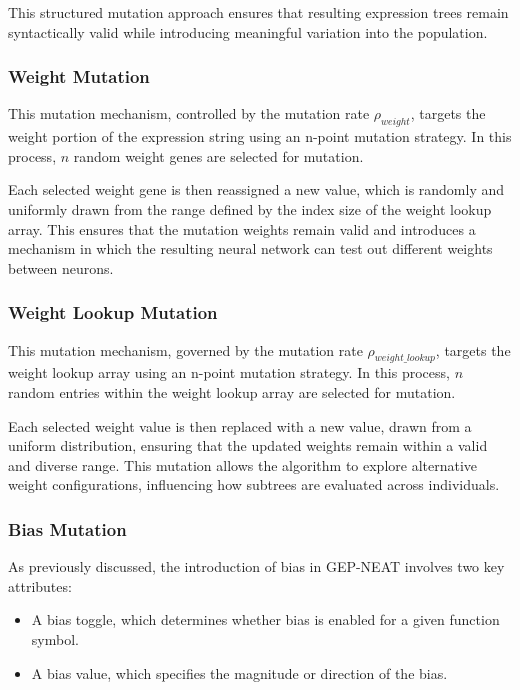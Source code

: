 \parbreak\noindent This structured mutation approach ensures that resulting expression trees remain syntactically valid while introducing meaningful variation into the population.

\subsubsection{Weight Mutation}
This mutation mechanism, controlled by the mutation rate $\rho_{weight}$, targets the weight portion of the expression string using an n-point mutation strategy. In this process, $n$ random weight genes are selected for mutation.

\parbreak\noindent Each selected weight gene is then reassigned a new value, which is randomly and uniformly drawn from the range defined by the index size of the weight lookup array. This ensures that the mutation weights remain valid and introduces a mechanism in which the resulting neural network can test out different weights between neurons.

\subsubsection{Weight Lookup Mutation}
This mutation mechanism, governed by the mutation rate $\rho_{weight\_lookup}$, targets the weight lookup array using an n-point mutation strategy. In this process, $n$ random entries within the weight lookup array are selected for mutation.

\parbreak\noindent Each selected weight value is then replaced with a new value, drawn from a uniform distribution, ensuring that the updated weights remain within a valid and diverse range. This mutation allows the algorithm to explore alternative weight configurations, influencing how subtrees are evaluated across individuals.

\subsubsection{Bias Mutation}
As previously discussed, the introduction of bias in GEP-NEAT involves two key attributes:
\begin{itemize}
	\item A bias toggle, which determines whether bias is enabled for a given function symbol.
	\item A bias value, which specifies the magnitude or direction of the bias.
\end{itemize}

